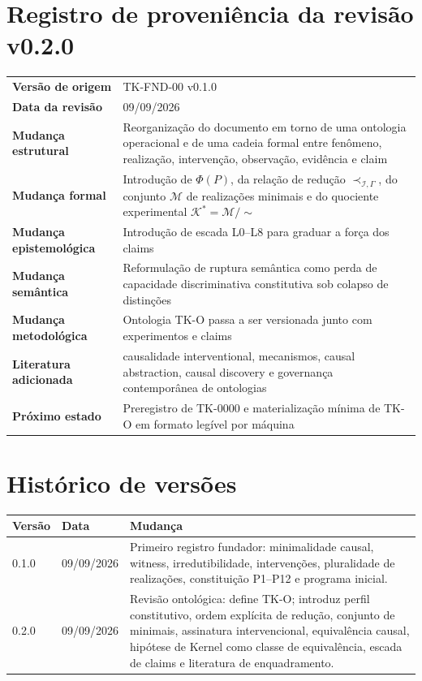 \documentclass[11pt,a4paper]{article}
\begin{document}
\appendix

\section{Registro de proveniência da revisão v0.2.0}

\begin{tabularx}{\textwidth}{>{\bfseries}p{4.1cm}X}
\toprule
Versão de origem & TK-FND-00 v0.1.0 \\
Data da revisão & 09/09/2026 \\
Mudança estrutural & Reorganização do documento em torno de uma ontologia operacional e
de uma cadeia formal entre fenômeno, realização, intervenção, observação, evidência e claim \\
Mudança formal & Introdução de $\Phi(P)$, da relação de redução
$\prec_{\mathcal I,\Gamma}$, do conjunto $\mathcal M$ de realizações minimais e do
quociente experimental $\mathcal K^{\ast}=\mathcal M/\sim$ \\
Mudança epistemológica & Introdução de escada L0--L8 para graduar a força dos claims \\
Mudança semântica & Reformulação de ruptura semântica como perda de capacidade
discriminativa constitutiva sob colapso de distinções \\
Mudança metodológica & Ontologia TK-O passa a ser versionada junto com experimentos e claims \\
Literatura adicionada & causalidade interventional, mecanismos, causal abstraction,
causal discovery e governança contemporânea de ontologias \\
Próximo estado & Preregistro de TK-0000 e materialização mínima de TK-O em formato legível por máquina \\
\bottomrule
\end{tabularx}

\section{Histórico de versões}

\begin{longtable}{p{2.0cm}p{2.7cm}p{9.7cm}}
\toprule
Versão & Data & Mudança \\
\midrule
\endhead
0.1.0 & 09/09/2026 &
Primeiro registro fundador: minimalidade causal, witness, irredutibilidade,
intervenções, pluralidade de realizações, constituição P1--P12 e programa inicial. \\

0.2.0 & 09/09/2026 &
Revisão ontológica: define TK-O; introduz perfil constitutivo, ordem explícita de
redução, conjunto de minimais, assinatura intervencional, equivalência causal,
hipótese de Kernel como classe de equivalência, escada de claims e literatura de
enquadramento. \\
\bottomrule
\end{longtable}
\end{document}
